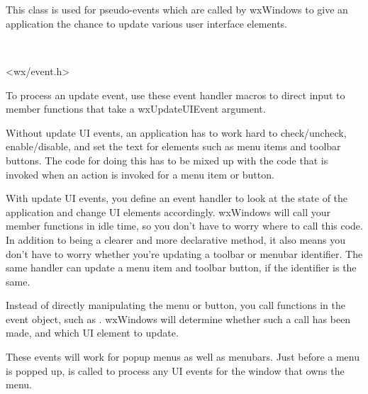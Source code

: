 \section{}\label{wxupdateuievent}

This class is used for pseudo-events which are called by wxWindows
to give an application the chance to update various user interface elements.


\\


<wx/event.h>


To process an update event, use these event handler macros to direct input to member
functions that take a wxUpdateUIEvent argument.

\twocolwidtha{7cm}
\begin{twocollist}\itemsep=0pt
\end{twocollist}%


Without update UI events, an application has to work hard to check/uncheck, enable/disable,
and set the text for elements such as menu items and toolbar buttons.
The code for doing this has to be mixed up with the code that is invoked when
an action is invoked for a menu item or button.

With update UI events, you define an event handler to look at the state of
the application and change UI elements accordingly. wxWindows will call your
member functions in idle time, so you don't have to worry where to call this code.
In addition to being a clearer and more declarative method, it also means you
don't have to worry whether you're updating a toolbar or menubar identifier.
The same handler can update a menu item and toolbar button, if the identifier is the same.

Instead of directly manipulating the menu or button, you call functions in the event
object, such as . wxWindows
will determine whether such a call has been made, and which UI element to update.

These events will work for popup menus as well as menubars. Just before a menu is popped
up,  is called to process any UI events for
the window that owns the menu.

